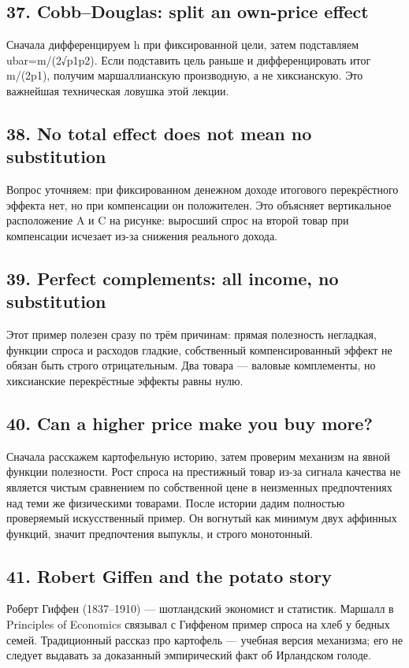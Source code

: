 \documentclass[11pt,a4paper]{article}
\begin{document}
\subsection*{37. Cobb--Douglas: split an own-price effect}
Сначала дифференцируем h при фиксированной цели, затем подставляем ubar=m/(2√p1p2). Если подставить цель раньше и дифференцировать итог m/(2p1), получим маршаллианскую производную, а не хиксианскую. Это важнейшая техническая ловушка этой лекции.

\subsection*{38. No total effect does not mean no substitution}
Вопрос уточняем: при фиксированном денежном доходе итогового перекрёстного эффекта нет, но при компенсации он положителен. Это объясняет вертикальное расположение A и C на рисунке: выросший спрос на второй товар при компенсации исчезает из-за снижения реального дохода.

\subsection*{39. Perfect complements: all income, no substitution}
Этот пример полезен сразу по трём причинам: прямая полезность негладкая, функции спроса и расходов гладкие, собственный компенсированный эффект не обязан быть строго отрицательным. Два товара — валовые комплементы, но хиксианские перекрёстные эффекты равны нулю.

\subsection*{40. Can a higher price make you buy more?}
Сначала расскажем картофельную историю, затем проверим механизм на явной функции полезности. Рост спроса на престижный товар из-за сигнала качества не является чистым сравнением по собственной цене в неизменных предпочтениях над теми же физическими товарами. После истории дадим полностью проверяемый искусственный пример. Он вогнутый как минимум двух аффинных функций, значит предпочтения выпуклы, и строго монотонный.

\subsection*{41. Robert Giffen and the potato story}
Роберт Гиффен (1837--1910) — шотландский экономист и статистик. Маршалл в Principles of Economics связывал с Гиффеном пример спроса на хлеб у бедных семей. Традиционный рассказ про картофель — учебная версия механизма; его не следует выдавать за доказанный эмпирический факт об Ирландском голоде.
\end{document}
